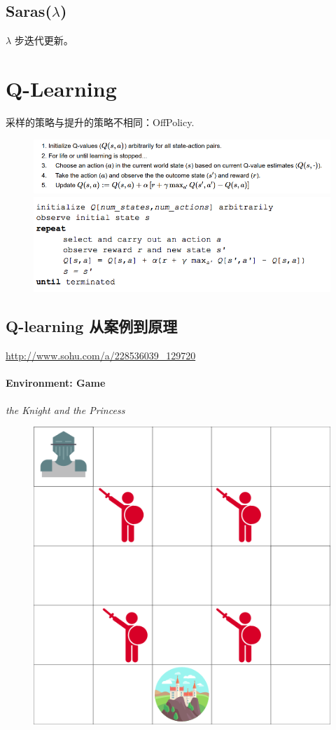 \documentclass[UTF8,a4paper,12pt]{ctexbook}
\begin{document}
		\subsection{Saras($\lambda$)}
			$\lambda$ 步迭代更新。
				
	\section{Q-Learning}
		采样的策略与提升的策略不相同：OffPolicy.
	
		\begin{figure}[H]
			\centering
			\includegraphics[width=\linewidth]{qFuncProcess2}
			\includegraphics[width=\linewidth]{qFuncProcess3}
		\end{figure}
		\subsection{Q-learning 从案例到原理}	
			\url{http://www.sohu.com/a/228536039_129720}
			
			\paragraph{Environment: Game}
				\textit{the Knight and the Princess}
				
				\begin{figure}[H]
					\centering
					\includegraphics[width=.5\linewidth]{game01}
				\end{figure}
				
\end{document}
